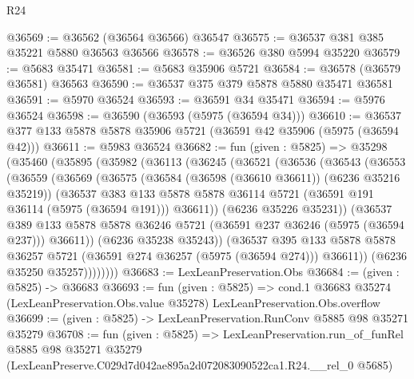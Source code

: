 \begin{lexlean}{R24}
\begin{coremodule}
@36569 := @36562 (@36564 @36566) @36547
@36575 := @36537 @381 @385 @35221 @5880 @36563 @36566
@36578 := @36526 @380 @5994 @35220
@36579 := @5683 @35471
@36581 := @5683 @35906 @5721
@36584 := @36578 (@36579 @36581) @36563
@36590 := @36537 @375 @379 @5878 @5880 @35471 @36581
@36591 := @5970 @36524
@36593 := @36591 @34 @35471
@36594 := @5976 @36524
@36598 := @36590 (@36593 (@5975 (@36594 @34)))
@36610 := @36537 @377 @133 @5878 @5878 @35906 @5721 (@36591 @42 @35906 (@5975 (@36594 @42)))
@36611 := @5983 @36524
@36682 := fun (given : @5825) =>
  @35298
    (@35460
      (@35895
        (@35982
          (@36113
            (@36245
              (@36521
                (@36536
                  (@36543
                    (@36553
                      (@36559
                        (@36569
                          (@36575
                            (@36584 (@36598 (@36610 @36611)) (@6236 @35216 @35219))
                            (@36537
                              @383
                              @133
                              @5878
                              @5878
                              @36114
                              @5721
                              (@36591 @191 @36114 (@5975 (@36594 @191)))
                              @36611))
                          (@6236 @35226 @35231))
                        (@36537
                          @389
                          @133
                          @5878
                          @5878
                          @36246
                          @5721
                          (@36591 @237 @36246 (@5975 (@36594 @237)))
                          @36611))
                      (@6236 @35238 @35243))
                    (@36537
                      @395
                      @133
                      @5878
                      @5878
                      @36257
                      @5721
                      (@36591 @274 @36257 (@5975 (@36594 @274)))
                      @36611))
                  (@6236 @35250 @35257))))))))
@36683 := LexLeanPreservation.Obs
@36684 := (given : @5825) -> @36683
@36693 := fun (given : @5825) =>
  cond.{1} @36683 @35274 (LexLeanPreservation.Obs.value @35278) LexLeanPreservation.Obs.overflow
@36699 := (given : @5825) -> LexLeanPreservation.RunConv @5885 @98 @35271 @35279
@36708 := fun (given : @5825) =>
  LexLeanPreservation.run_of_funRel
    @5885
    @98
    @35271
    @35279
    (LexLeanPreserve.C029d7d042ae895a2d072083090522ca1.R24.__rel_0 @5685)
\end{coremodule}
\end{lexlean}
